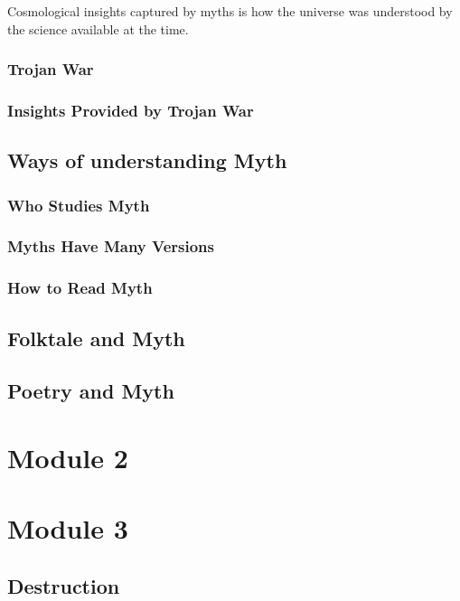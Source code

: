 \documentclass{article}
\begin{document}
Cosmological insights captured by myths is how the universe was understood by the science available at the time.

\subsubsection{Trojan War}

\subsubsection{Insights Provided by Trojan War}

\subsection{Ways of understanding Myth}

\subsubsection{Who Studies Myth}

\subsubsection{Myths Have Many Versions}

\subsubsection{How to Read Myth}

\subsection{Folktale and Myth}

\subsection{Poetry and Myth}

\section{Module 2}
\section{Module 3}

\subsection{Destruction}
\end{document}
